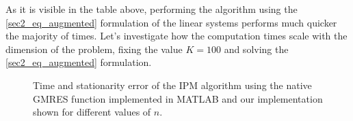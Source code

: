 As it is visible in the table above, performing the algorithm using the \ref{sec2_eq_augmented} formulation of the linear systems performs much quicker the majority of times. Let's investigate how the computation times scale with the dimension of the problem, fixing the value \(K=100\) and solving the \ref{sec2_eq_augmented} formulation.

\begin{figure}[H]
    \centering
    \caption{Time and stationarity error of the IPM algorithm using the native GMRES function implemented in MATLAB and our implementation shown for different values of \(n\).}
    \label{time_accuracy}
  \end{figure}

